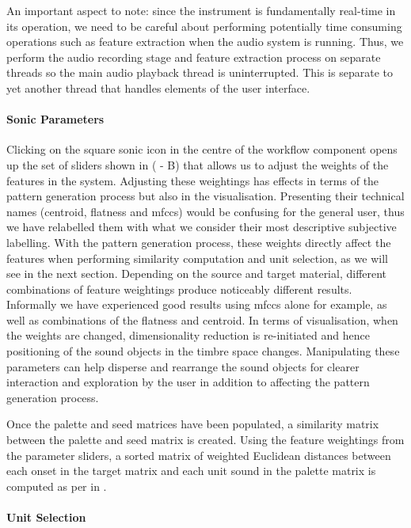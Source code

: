 An important aspect to note: since the instrument is fundamentally real-time in its operation, we need to be careful about performing potentially time consuming operations such as feature extraction when the audio system is running. Thus, we perform the audio recording stage and feature extraction process on separate threads so the main audio playback thread is uninterrupted. This is separate to yet another thread that handles elements of the user interface.

\paragraph{Sonic Parameters}

Clicking on the square sonic icon in the centre of the workflow component opens up the set of sliders shown in ( - B) that allows us to adjust the weights of the features in the system. Adjusting these weightings has effects in terms of the pattern generation process but also in the visualisation. Presenting their technical names (centroid, flatness and \acrshort{mfcc}s) would be confusing for the general user, thus we have relabelled them with what we consider their most descriptive subjective labelling. With the pattern generation process, these weights directly affect the features when performing similarity computation and unit selection, as we will see in the next section. Depending on the source and target material, different combinations of feature weightings produce noticeably different results. Informally we have experienced good results using \acrshort{mfcc}s alone for example, as well as combinations of the flatness and centroid. In terms of visualisation, when the weights are changed, dimensionality reduction is re-initiated and hence positioning of the sound objects in the timbre space changes. Manipulating these parameters can help disperse and rearrange the sound objects for clearer interaction and exploration by the user in addition to affecting the pattern generation process.

Once the palette and seed matrices have been populated, a similarity matrix between the palette and seed matrix is created. Using the feature weightings from the parameter sliders, a sorted matrix of weighted Euclidean distances between each onset in the target matrix and each unit sound in the palette matrix is computed as per  in .

\paragraph{Unit Selection}


